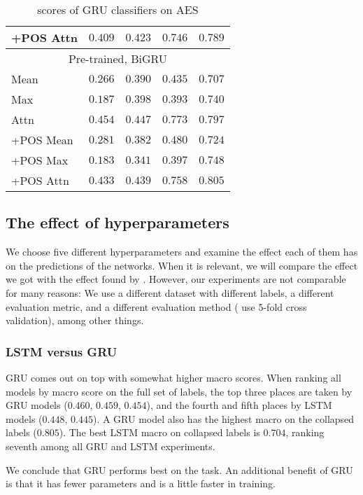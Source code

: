 \begin{table}
\begin{tabular}{lrrrr}
    +POS Attn & $0.409$ & $0.423$ & $0.746$ & $0.789$ \\
    \midrule \multicolumn{5}{c}{Pre-trained, BiGRU} \\ \midrule
    Mean & $0.266$ & $0.390$ & $0.435$ & $0.707$ \\
    Max & $0.187$ & $0.398$ & $0.393$ & $0.740$ \\
    Attn & $0.454$ & $0.447$ & $0.773$ & $0.797$ \\
    +POS Mean & $0.281$ & $0.382$ & $0.480$ & $0.724$ \\
    +POS Max & $0.183$ & $0.341$ & $0.397$ & $0.748$ \\
    +POS Attn & $0.433$ & $0.439$ & $0.758$ & $0.805$ \\
    \bottomrule
  \end{tabular}
  \caption{\FI scores of GRU classifiers on AES}
  \label{tab:gru-results}
\end{table}


\subsection{The effect of hyperparameters}

We choose five different hyperparameters and examine the effect each of them
has on the predictions of the networks. When it is relevant, we will compare
the effect we got with the effect found by \textcite{taghipour16}. However,
our experiments are not comparable for many reasons: We use a different
dataset with different labels, a different evaluation metric, and a different
evaluation method (\citeauthor{taghipour16} use 5-fold cross validation),
among other things. 


\subsubsection{LSTM versus GRU}

GRU comes out on top with somewhat higher macro \FI scores. When ranking all
models by macro \FI score on the full set of labels, the top three places are
taken by GRU models ($0.460$, $0.459$, $0.454$), and the fourth and fifth
places by LSTM models ($0.448$, $0.445$). A GRU model also has the highest
macro \FI on the collapsed labels ($0.805$). The best LSTM macro \FI on
collapsed labels is $0.704$, ranking seventh among all GRU and LSTM
experiments.

We conclude that GRU performs best on the task. An additional benefit of GRU
is that it has fewer parameters and is a little faster in training.


